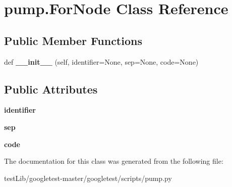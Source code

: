\hypertarget{classpump_1_1ForNode}{}\section{pump.\+For\+Node Class Reference}
\label{classpump_1_1ForNode}
\subsection*{Public Member Functions}
\begin{DoxyCompactItemize}
\item 
\mbox{\label{classpump_1_1ForNode_a9cf60468cacdb06acce35074ab2a2b55}} 
def {\bfseries \+\_\+\+\_\+init\+\_\+\+\_\+} (self, identifier=None, sep=None, code=None)
\end{DoxyCompactItemize}
\subsection*{Public Attributes}
\begin{DoxyCompactItemize}
\item 
\mbox{\label{classpump_1_1ForNode_a2444199e135e43696b3a006bd0d38982}} 
{\bfseries identifier}
\item 
\mbox{\label{classpump_1_1ForNode_a06b493278b3c1ad53363a2bcc3b8efb3}} 
{\bfseries sep}
\item 
\mbox{\label{classpump_1_1ForNode_afdb5f4f2a3bc772bbc6ea777dfde898e}} 
{\bfseries code}
\end{DoxyCompactItemize}


The documentation for this class was generated from the following file\+:\begin{DoxyCompactItemize}
\item 
test\+Lib/googletest-\/master/googletest/scripts/pump.\+py\end{DoxyCompactItemize}
